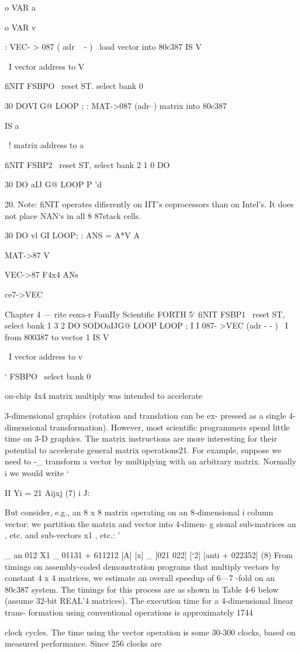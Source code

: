 {{{o VAR a{{ o VAR v{

: VEC- > 087 ( adr ~ - ) \ load vector into 80c387
IS V{ \ I vector address to V{
fiNIT FSBPO \ reset ST. select bank 0

30 DOV{I} G@ LOOP ;
: MAT->087 (adr--) \Ioad matrix into 80c387

IS a{{ \ ! matrix address to a{{
fiNIT FSBP2 \ reset ST, select bank 2
1 0 DO

30 DO a{{IJ}} G@ LOOP
P \cont'd

 

20. Note: fiNIT operates difierently on IIT’s coprocessors than on Intel’s. It does not place NAN‘s
in all 8 87stack cells.

30 DO v{l} GI LOOP;
\example: ANS = A*V
A{{ MAT->87 V{ VEC->87 F4x4 ANs{ce7->VEC

Chapter 4 — rite eoxa-r FamIIy Scientific FORTH 5‘
fiNIT FSBP1 \ reset ST, select bank 1
3 2 DO
SODOa{{IJ}}G@ LOOP
LOOP ; I
I
087- >VEC (adr - - ) \ I from 800387 to vector 1
IS V{ \ I vector address to v{ ‘
FSBPO \ select bank 0 %

 

 on-chip 4x4 matrix multiply was intended to accelerate

3-dimensional graphics (rotation and translation can be ex-
pressed as a single 4-dimensional transformation). However, most
scientific programmers spend little time on 3-D graphics. The matrix
instructions are more interesting for their potential to accelerate
general matrix operations21. For example, suppose we need to -_
transform a vector by multiplying with an arbitrary matrix. Normally i
we would write ‘

   

II
Yi = 21 Aijxj (7) i
J:

But consider, e.g., an 8 x 8 matrix operating on an 8-dimensional i
column vector: we partition the matrix and vector into 4-dimen- g
sional sub-matrices an , etc. and sub-vectors x1 , etc.: '

_ an 012 X1 _ 01131 + 611212
[A] [x] _ [021 022] [‘2] [anti + 022352] (8)
From timings on assembly-coded demonstration programs that
multiply vectors by constant 4 x 4 matrices, we estimate an overall
speedup of 6—7 -fold on an 80c387 system. The timings for this
process are as shown in Table 4-6 below (assume 32-bit REAL'4
matrices). The execution time for a 4-dimensional linear trans-
formation using conventional operations is approximately 1744

clock cycles. The time using the vector operation is some 30-300
clocks, based on measured performance. Since 256 clocks are

}}}}}}}}}}}}}}}}}}
